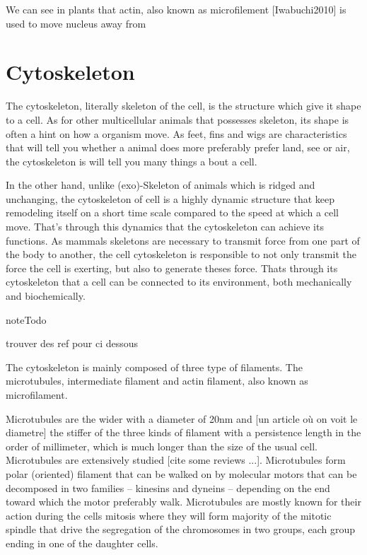 \documentclass[A4paperpaper,11pt,english]{sphinxmanual}
\begin{document}
We can see in plants that actin, also known as microfilement {[}Iwabuchi2010{]} is used to move nucleus away from


\section{Cytoskeleton}
\label{parts/part1:cytoskeleton}
The cytoskeleton, literally skeleton of the cell, is the structure which give
it shape to a cell.  As for other multicellular animals that possesses
skeleton, its shape is often a hint on how a organism move. As feet, fins and
wigs are characteristics that will tell you whether a animal does more
preferably prefer land, see or air, the cytoskeleton is will tell you many
things a bout a cell.

In the other hand, unlike (exo)-Skeleton of animals which is ridged and
unchanging, the cytoskeleton of cell is a  highly dynamic structure that keep
remodeling itself on a short time scale compared to the speed at which a cell
move. That's through this dynamics that the cytoskeleton can achieve its
functions.  As mammals skeletons are necessary to transmit force from one part
of the body to another, the cell cytoskeleton is responsible to not only
transmit the force the cell is exerting, but also to generate theses force.
Thats through its cytoskeleton that a cell can be connected to its environment,
both mechanically and biochemically.

\begin{notice}{note}{Todo}

trouver des ref pour ci dessous
\end{notice}

The cytoskeleton is mainly composed of three type of filaments.  The
microtubules, intermediate filament and actin filament, also known as
microfilament.

Microtubules are the wider with a diameter of 20nm and {[}un article où on voit le diametre{]} the stiffer of the three kinds of filament with a persistence
length in the order of millimeter, which is much longer than the size of the
usual cell. Microtubules are extensively studied {[}cite some reviews ...{]}.
Microtubules form polar (oriented) filament that can be walked on by molecular
motors that can be decomposed in two families – kinesins  and dyneins –
depending on the end toward which the motor preferably walk. Microtubules are
mostly known for their action during the cells mitosis where they will form
majority of the mitotic spindle that drive the segregation of the chromosomes
in two groups, each group ending in one of the daughter cells.
\end{document}
